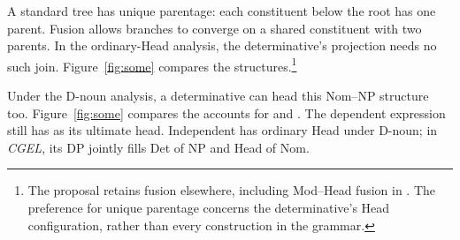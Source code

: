 \documentclass[12pt]{article}
\begin{document}
A standard tree has unique parentage: each constituent below the root has one parent. Fusion allows branches to converge on a shared constituent with two parents. In the ordinary-Head analysis, the determinative's projection needs no such join. Figure~\ref{fig:some} compares the structures.\footnote{The proposal retains fusion elsewhere, including Mod--Head fusion in . The preference for unique parentage concerns the determinative's Head configuration, rather than every construction in the grammar.}

Under the D-noun analysis, a determinative can head this Nom--NP structure too. Figure~\ref{fig:some} compares the accounts for  and . The dependent expression still has  as its ultimate head. Independent  has ordinary Head under D-noun; in \textit{CGEL}, its DP jointly fills Det of NP and Head of Nom.
\end{document}
